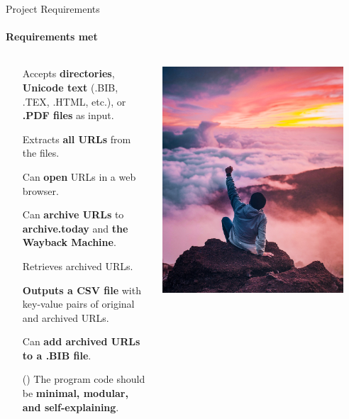 \documentclass[
    ngerman,%
    authorontitle=true,
]{bfhbeamer}
\begin{document}
	\begin{frame}{Project Requirements}
		\framesubtitle{Requirements met}
		\begin{columns} %
			\begin{column}{0.7\textwidth} %
				\begin{itemize}
					\item[\checkmark] Accepts \textbf{directories}, \textbf{Unicode text} (.BIB, .TEX, .HTML, etc.), or \textbf{.PDF files} as input.
					\item[\checkmark] Extracts \textbf{all URLs} from the files.
					\item[\checkmark] Can \textbf{open} URLs in a web browser.
					\item[\checkmark] Can \textbf{archive URLs} to \textbf{archive.today} and \textbf{the Wayback Machine}.
					\item[\checkmark] Retrieves archived URLs.
					\item[\checkmark] \textbf{Outputs a CSV file} with key-value pairs of original and archived URLs.
					\item[\checkmark] Can \textbf{add archived URLs to a .BIB file}.
					\item[(\checkmark)] The program code should be \textbf{minimal, modular, and self-explaining}.
				\end{itemize}
				
			\end{column}
			\begin{column}{0.3\textwidth} %
				\begin{center}
					\includegraphics[width=0.9\textwidth]{pictures/final_presentation/achievement.jpg}
				\end{center}
			\end{column}
		\end{columns}
		

\end{frame}
\end{document}
